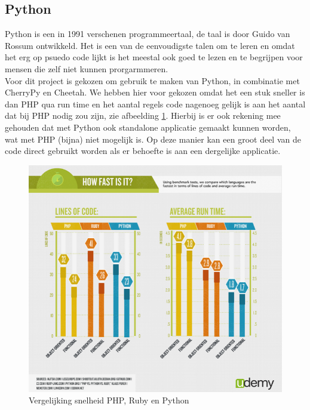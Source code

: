 \documentclass[twoside,openright]{uva-bachelor-thesis}
\begin{document}
			\subsection{Python}
				Python is een in 1991 verschenen programmeertaal, de taal is door Guido van Rossum ontwikkeld. Het is een van de eenvoudigste talen om te leren en omdat het erg op psuedo code lijkt is het meestal ook goed te lezen en te begrijpen voor mensen die zelf niet kunnen prorgarmmeren.
				\\[0.5cm]
			Voor dit project is gekozen om gebruik te maken van Python, in combinatie met CherryPy en Cheetah. We hebben hier voor gekozen omdat het een stuk sneller is dan PHP qua run time en het aantal regels code nagenoeg gelijk is aan het aantal dat bij PHP nodig zou zijn, zie afbeelding \ref{fig:phpvspython2}. Hierbij is er ook rekening mee gehouden dat met Python ook standalone applicatie gemaakt kunnen worden, wat met PHP (bijna) niet mogelijk is. Op deze manier kan een groot deel van de code direct gebruikt worden als er behoefte is aan een dergelijke applicatie.
			\begin{figure}[!htb]
				\centering
				\includegraphics[scale=0.9]{./img/phpvspython2.png}
				\caption{Vergelijking snelheid PHP, Ruby en Python}
				\label{fig:phpvspython2}
			\end{figure}
\end{document}
